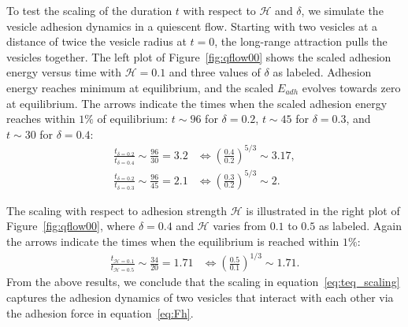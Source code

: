 \documentclass[prf,superscriptaddress,showpacs]{revtex4-1}
\begin{document}
To test the scaling of the duration $t$ with respect to $\mathcal{H}$
and $\delta$, we simulate the vesicle adhesion dynamics in a quiescent
flow.  Starting with two vesicles at a distance of twice the vesicle
radius at $t=0$, the long-range attraction pulls the vesicles together.
The left plot of Figure~\ref{fig:qflow00} shows the scaled adhesion
energy versus time with $\mathcal{H}=0.1$ and three values of $\delta$
as labeled.  Adhesion energy reaches minimum at equilibrium, and the
scaled $E_{adh}$ evolves towards zero at equilibrium.  The arrows
indicate the times when the scaled adhesion energy reaches within $1\%$
of equilibrium: $t\sim 96$ for $\delta=0.2$, $t\sim 45$ for $\delta =
0.3$, and $t\sim 30$ for $\delta=0.4$:
\begin{align*}
\frac{t_{\delta=0.2}}{t_{\delta=0.4}} \sim \frac{96}{30}=3.2 
  &\Longleftrightarrow \left(\frac{0.4}{0.2}\right)^{5/3}\sim 3.17,\\
\frac{t_{\delta=0.2}}{t_{\delta=0.3}} \sim \frac{96}{45}=2.1 
  &\Longleftrightarrow \left(\frac{0.3}{0.2}\right)^{5/3}\sim 2.
\end{align*}

The scaling with respect to adhesion strength $\mathcal{H}$ is
illustrated in the right plot of Figure~\ref{fig:qflow00}, where $\delta
= 0.4$ and $\mathcal{H}$ varies from $0.1$ to $0.5$ as labeled.  Again
the arrows indicate the times when the equilibrium is reached within
$1\%$:
\begin{align*}
  \frac{t_{\mathcal{H}=0.1}}{t_{\mathcal{H}=0.5}} \sim \frac{34}{20} = 1.71 
  &\Longleftrightarrow \left(\frac{0.5}{0.1}\right)^{1/3}\sim 1.71.
\end{align*}
From the above results, we conclude that the scaling in
equation~\eqref{eq:teq_scaling} captures the adhesion dynamics of two
vesicles that interact with each other via the adhesion force in
equation~\eqref{eq:Fh}.
\end{document}
